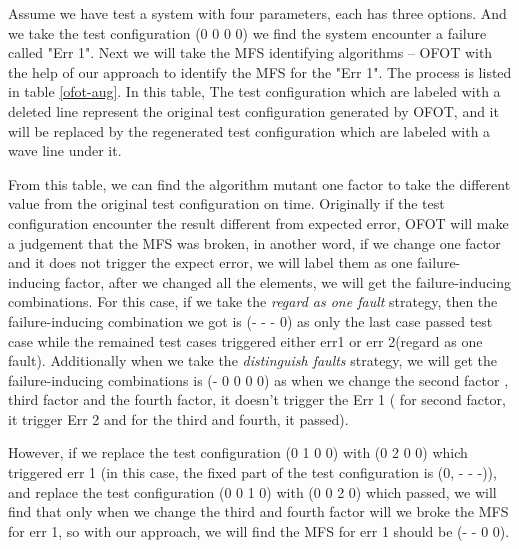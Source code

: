\documentclass{sig-alternate}
\begin{document}
Assume we have test a system with four parameters, each has three options. And we take the test configuration (0 0 0 0) we find the system encounter a failure called "Err 1". Next we will take the MFS identifying algorithms -- OFOT with the help of our approach to identify the MFS for the "Err 1". The process is listed in table \ref{ofot-aug}. In this table, The test configuration which are labeled with a deleted line represent the original test configuration generated by OFOT, and it will be replaced by the regenerated test configuration which are labeled with a wave line under it.

From this table, we can find the algorithm mutant one factor to take the different value from the original test configuration on time. Originally if the test configuration encounter the result different from expected error, OFOT will make a judgement that the MFS was broken, in another word, if we change one factor and it does not trigger the expect error, we will label them as one failure-inducing factor, after we changed all the elements, we will get the failure-inducing combinations. For this case, if we take the \emph{regard as one fault} strategy, then the failure-inducing combination we got is (- - - 0) as only the last case passed test case while the remained test cases triggered either err1 or err 2(regard as one fault).  Additionally when we take the \emph{distinguish faults} strategy, we will get the failure-inducing combinations is (- 0 0 0 0) as when we change the second factor , third factor and the fourth factor, it doesn't trigger the Err 1 ( for second factor, it trigger Err 2 and for the third and fourth, it passed).


However, if we replace the test configuration (0 1 0 0) with (0 2 0 0) which triggered err 1 (in this case, the fixed part of the test configuration is (0, - - -)), and replace the test configuration (0 0 1 0) with (0 0 2 0) which passed, we will find that only when we change the third and fourth factor will we broke the MFS for err 1, so with our approach, we will find the MFS for err 1 should be (- - 0 0).
\end{document}
